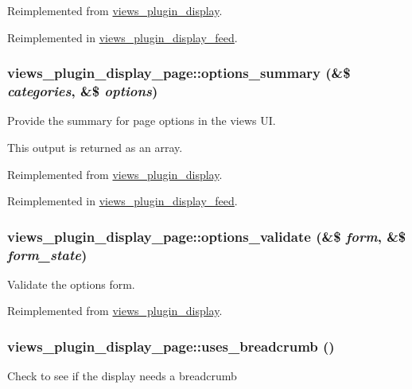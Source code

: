 Reimplemented from \hyperlink{classviews__plugin__display_a75f0b2d5587b365640fcb4d414daae36}{views\_\-plugin\_\-display}.

Reimplemented in \hyperlink{classviews__plugin__display__feed_ab7cca15934456ddb26045f03483899fb}{views\_\-plugin\_\-display\_\-feed}.\hypertarget{classviews__plugin__display__page_a47de087f3201600b057e0d4a55eef48c}{
\subsubsection[{options\_\-summary}]{\setlength{\rightskip}{0pt plus 5cm}views\_\-plugin\_\-display\_\-page::options\_\-summary (\&\$ {\em categories}, \/  \&\$ {\em options})}}
\label{classviews__plugin__display__page_a47de087f3201600b057e0d4a55eef48c}
Provide the summary for page options in the views UI.

This output is returned as an array. 

Reimplemented from \hyperlink{classviews__plugin__display_a7a2f2aeedfc14816815e3ce65a61aedf}{views\_\-plugin\_\-display}.

Reimplemented in \hyperlink{classviews__plugin__display__feed_a5c0b5faad36090985c85b16a454023a6}{views\_\-plugin\_\-display\_\-feed}.\hypertarget{classviews__plugin__display__page_a192c8feb8740fdb389600fb7a8588c27}{
\subsubsection[{options\_\-validate}]{\setlength{\rightskip}{0pt plus 5cm}views\_\-plugin\_\-display\_\-page::options\_\-validate (\&\$ {\em form}, \/  \&\$ {\em form\_\-state})}}
\label{classviews__plugin__display__page_a192c8feb8740fdb389600fb7a8588c27}
Validate the options form. 

Reimplemented from \hyperlink{classviews__plugin__display_a0b4336df4db25dec552de8d20141a9f5}{views\_\-plugin\_\-display}.\hypertarget{classviews__plugin__display__page_acbdafb32168f809b28e083d654399f3f}{
\subsubsection[{uses\_\-breadcrumb}]{\setlength{\rightskip}{0pt plus 5cm}views\_\-plugin\_\-display\_\-page::uses\_\-breadcrumb ()}}
\label{classviews__plugin__display__page_acbdafb32168f809b28e083d654399f3f}
Check to see if the display needs a breadcrumb


